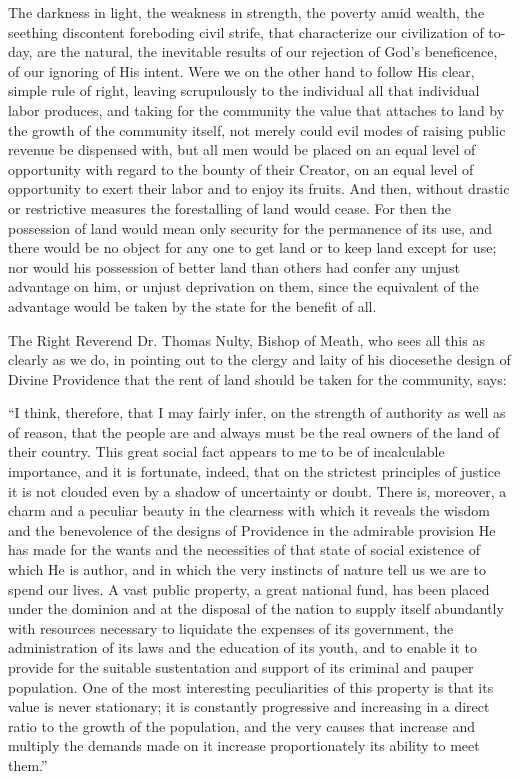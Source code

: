 \documentclass{book}
\begin{document}
The darkness in light, the weakness in strength, the poverty amid wealth, the seething discontent foreboding civil strife, that characterize our civilization of to-day, are the natural, the inevitable results of our rejection of God’s beneficence, of our ignoring of His intent. Were we on the other hand to follow His clear, simple rule of right, leaving scrupulously to the individual all that individual labor produces, and taking for the community the value that attaches to land by the growth of the community itself, not merely could evil modes of raising public revenue be dispensed with, but all men would be placed on an equal level of opportunity with regard to the bounty of their Creator, on an equal level of opportunity to exert their labor and to enjoy its fruits. And then, without drastic or restrictive measures the forestalling of land would cease. For then the possession of land would mean only security for the permanence of its use, and there would be no object for any one to get land or to keep land except for use; nor would his possession of better land than others had confer any unjust advantage on him, or unjust deprivation on them, since the equivalent of the advantage would be taken by the state for the benefit of all.

The Right Reverend Dr. Thomas Nulty, Bishop of Meath, who sees all this as clearly as we do, in pointing out to the clergy and laity of his diocese\footnotemark[2] the design of Divine Providence that the rent of land should be taken for the community, says:

“I think, therefore, that I may fairly infer, on the strength of authority as well as of reason, that the people are and always must be the real owners of the land of their country. This great social fact appears to me to be of incalculable importance, and it is fortunate, indeed, that on the strictest principles of justice it is not clouded even by a shadow of uncertainty or doubt. There is, moreover, a charm and a peculiar beauty in the clearness with which it reveals the wisdom and the benevolence of the designs of Providence in the admirable provision He has made for the wants and the necessities of that state of social existence of which He is author, and in which the very instincts of nature tell us we are to spend our lives. A vast public property, a great national fund, has been placed under the dominion and at the disposal of the nation to supply itself abundantly with resources necessary to liquidate the expenses of its government, the administration of its laws and the education of its youth, and to enable it to provide for the suitable sustentation and support of its criminal and pauper population. One of the most interesting peculiarities of this property is that its value is never stationary; it is constantly progressive and increasing in a direct ratio to the growth of the population, and the very causes that increase and multiply the demands made on it increase proportionately its ability to meet them.”
\end{document}
